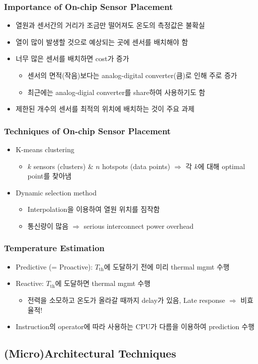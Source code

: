 \subsubsection*{Importance of On-chip Sensor Placement}
\begin{itemize}
    \item 열원과 센서간의 거리가 조금만 떨어져도 온도의 측정값은 불확실
    \item 열이 많이 발생할 것으로 예상되는 곳에 센서를 배치해야 함
    \item 너무 많은 센서를 배치하면 cost가 증가
    \begin{itemize}
        \item 센서의 면적(작음)보다는 analog-digital converter(큼)로 인해 주로 증가
        \item 최근에는 analog-digial converter를 share하여 사용하기도 함
    \end{itemize}
    \item 제한된 개수의 센서를 최적의 위치에 배치하는 것이 주요 과제
\end{itemize}

\subsubsection*{Techniques of On-chip Sensor Placement}
\begin{itemize}
    \item K-means clustering
    \begin{itemize}
        \item $k$ sensors (clusters) \& $n$ hotspots (data points) $\Rightarrow$ 각 $k$에 대해 optimal point를 찾아냄
    \end{itemize}
    \item Dynamic selection method
    \begin{itemize}
        \item Interpolation을 이용하여 열원 위치를 짐작함
        \item 통신량이 많음 $\Rightarrow$ serious interconnect power overhead
    \end{itemize}
\end{itemize}

\subsubsection*{Temperature Estimation}
\begin{itemize}
    \item Predictive (= Proactive): $T_{\mathrm{th}}$에 도달하기 전에 미리 thermal mgmt 수행
    \item Reactive: $T_{\mathrm{th}}$에 도달하면 thermal mgmt 수행
    \begin{itemize}
        \item 전력을 소모하고 온도가 올라갈 때까지 delay가 있음, Late response $\Rightarrow$ 비효율적!
    \end{itemize}
    \item Instruction의 operator에 따라 사용하는 CPU가 다름을 이용하여 prediction 수행
\end{itemize}

\subsection{(Micro)Architectural Techniques}
